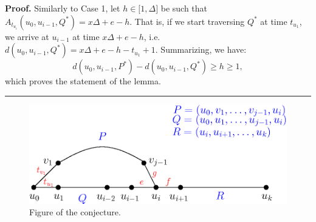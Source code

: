 \documentclass{article}
\newenvironment{proof}[1][Proof]{\noindent\textbf{#1.} }{\ \rule{0.5em}{0.5em}}
\begin{document}
\begin{proof}
		Similarly to Case 1, let $h\in \lbrack 1,\Delta ]$ be such that $%
		A_{t_{u_{i}}}(u_{0},u_{i-1},Q^{\ast })=x\Delta +e-h$. That is, if we start
		traversing $Q^{\ast }$ at time $t_{u_{1}}$, we arrive at $u_{i-1}$ at time $%
		x\Delta +e-h$, i.e. $d(u_{0},u_{i-1},Q^{\ast })=x\Delta +e-h-t_{u_{1}}+1$.
		Summarizing, we have:%
		\begin{equation*}
			d(u_{0},u_{i-1},P^{\ast })-d(u_{0},u_{i-1},Q^{\ast })\geq h\geq 1,
		\end{equation*}%
		which proves the statement of the lemma.
	\end{proof}
	
	\medskip
	
	\begin{figure}[htbp]
		\centering
		\includegraphics[width=0.6\linewidth]{conj-fig}
		\caption{Figure of the conjecture.}
		\label{conj-fig}
	\end{figure}
	
	
\end{document}
